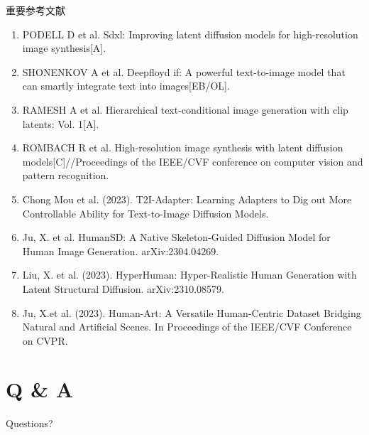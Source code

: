 \documentclass[
    fontset=fandol,
    xcolor=svgnames %
]{ctexbeamer}
\begin{document}
\begin{frame}
     \begin{block}{重要参考文献}
     \scriptsize
        \begin{enumerate}
           \item PODELL D et al. Sdxl: Improving latent diffusion models for high-resolution image synthesis[A].
           \item SHONENKOV A et al. Deepfloyd if: A powerful text-to-image model that can smartly integrate text into images[EB/OL].
           \item RAMESH A et al. Hierarchical text-conditional image generation with clip latents: Vol. 1[A].
           \item ROMBACH R et al. High-resolution image synthesis with latent diffusion models[C]//Proceedings of the IEEE/CVF conference on computer vision and pattern recognition.
           \item Chong Mou et al. (2023). T2I-Adapter: Learning Adapters to Dig out More Controllable Ability for Text-to-Image Diffusion Models.
           \item Ju, X. et al. HumanSD: A Native Skeleton-Guided Diffusion Model for Human Image Generation. arXiv:2304.04269.
           \item Liu, X. et al. (2023). HyperHuman: Hyper-Realistic Human Generation with Latent Structural Diffusion. arXiv:2310.08579.
           \item Ju, X.et al. (2023). Human-Art: A Versatile Human-Centric Dataset Bridging Natural and Artificial Scenes. In Proceedings of the IEEE/CVF Conference on CVPR.
        \end{enumerate}
    \end{block}
\end{frame}
     

\section{Q \& A}

\begin{frame}

    \begin{block}{Questions?}
        ~\\
        ~\\
        \\
        ~\\
        ~\\
        ~\\
        ~\\
    \end{block}

\end{frame}
\end{document}
